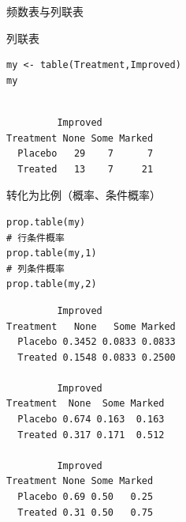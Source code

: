\documentclass[presentation]{beamer}
\begin{document}
\begin{frame}[fragile,label={sec:orgfab4d0a}]{频数表与列联表}
\begin{block}{列联表}
\begin{verbatim}
my <- table(Treatment,Improved)
my
\end{verbatim}

\begin{verbatim}

         Improved
Treatment None Some Marked
  Placebo   29    7      7
  Treated   13    7     21
\end{verbatim}
\end{block}

\begin{block}{转化为比例（概率、条件概率）}
\begin{verbatim}
prop.table(my)
# 行条件概率
prop.table(my,1)
# 列条件概率
prop.table(my,2)
\end{verbatim}

\begin{verbatim}
         Improved
Treatment   None   Some Marked
  Placebo 0.3452 0.0833 0.0833
  Treated 0.1548 0.0833 0.2500

         Improved
Treatment  None  Some Marked
  Placebo 0.674 0.163  0.163
  Treated 0.317 0.171  0.512

         Improved
Treatment None Some Marked
  Placebo 0.69 0.50   0.25
  Treated 0.31 0.50   0.75
\end{verbatim}
\end{block}
\end{frame}
\end{document}
